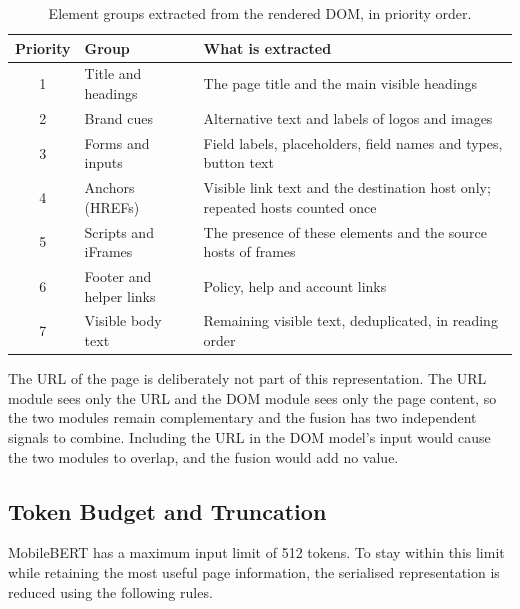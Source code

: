\documentclass{FastFyp}
\begin{document}
\begin{table}[!ht]
\centering
\caption{Element groups extracted from the rendered DOM, in priority order.}
\label{tab:dom-groups}
\begin{tabularx}{\textwidth}{|c|>{\raggedright\arraybackslash}X|>{\raggedright\arraybackslash}X|}
\hline
\textbf{Priority} & \textbf{Group} & \textbf{What is extracted} \\
\hline
1 & Title and headings & The page title and the main visible headings \\
\hline
2 & Brand cues & Alternative text and labels of logos and images \\
\hline
3 & Forms and inputs & Field labels, placeholders, field names and types, button text \\
\hline
4 & Anchors (HREFs) & Visible link text and the destination host only; repeated hosts counted once \\
\hline
5 & Scripts and iFrames & The presence of these elements and the source hosts of frames \\
\hline
6 & Footer and helper links & Policy, help and account links \\
\hline
7 & Visible body text & Remaining visible text, deduplicated, in reading order \\
\hline
\end{tabularx}
\end{table}

The URL of the page is deliberately not part of this representation. The URL module sees only the URL and the DOM module sees only the page content, so the two modules remain complementary and the fusion has two independent signals to combine. Including the URL in the DOM model's input would cause the two modules to overlap, and the fusion would add no value.

\subsection{Token Budget and Truncation}
\label{sec:token-budget}

MobileBERT has a maximum input limit of 512 tokens. To stay within this limit while retaining the most useful page information, the serialised representation is reduced using the following rules.
\end{document}
